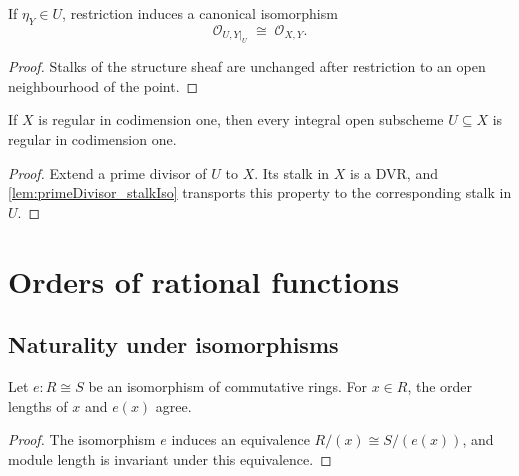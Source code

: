 \begin{lemma}
  \label{lem:primeDivisor_stalkIso}
  \leanok

  If \(\eta_Y\in U\), restriction induces a canonical isomorphism
  \[
    \mathcal O_{U,Y|_U}\;\cong\;\mathcal O_{X,Y}.
  \]
\end{lemma}
\begin{proof}
  \leanok
  Stalks of the structure sheaf are unchanged after restriction to an open
  neighbourhood of the point.
\end{proof}

\begin{theorem}
  \label{thm:isRegularInCodimensionOne_open}
  \leanok

  If \(X\) is regular in codimension one, then every integral open subscheme
  \(U\subseteq X\) is regular in codimension one.
\end{theorem}
\begin{proof}
  \leanok
  Extend a prime divisor of \(U\) to \(X\).  Its stalk in \(X\) is a DVR, and
  \cref{lem:primeDivisor_stalkIso} transports this property to the
  corresponding stalk in \(U\).
\end{proof}

\section{Orders of rational functions}

\subsection{Naturality under isomorphisms}
\label{subsec:ordFrac_ringEquiv}

\begin{lemma}
  \label{lem:ord_ringEquiv}
  \leanok

  Let \(e\colon R\cong S\) be an isomorphism of commutative rings.  For
  \(x\in R\), the order lengths of \(x\) and \(e(x)\) agree.
\end{lemma}
\begin{proof}
  \leanok
  The isomorphism \(e\) induces an equivalence
  \(R/(x)\cong S/(e(x))\), and module length is invariant under this
  equivalence.
\end{proof}

